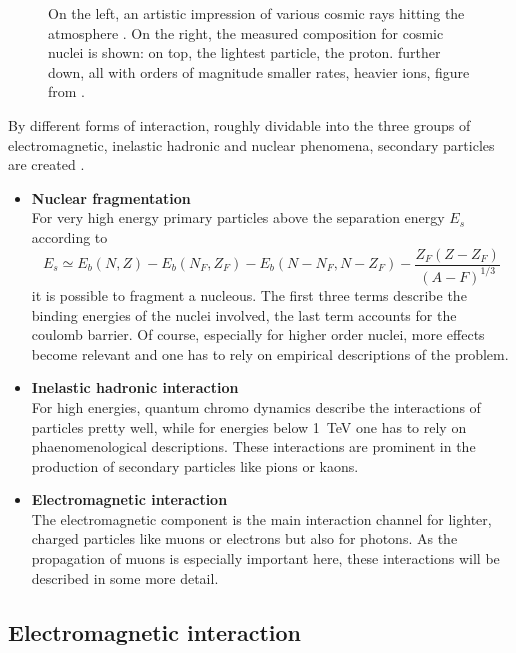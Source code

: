 \begin{figure}
\begin{minipage}[d]{0.49 \textwidth}
	\end{minipage}
	\caption[Cosmic ray composition]{On the left, an artistic impression of various cosmic rays hitting the atmosphere \cite{airShower}. On the right, the measured composition for cosmic nuclei is shown: on top, the lightest particle, the proton. further down, all with orders of magnitude smaller rates, heavier ions, figure from \cite{highEnergyCosmicRays}.}
	\label{fig:Introduction:sec:CosmicRays}
    \end{figure}
    By different forms of interaction, roughly dividable into the three groups of electromagnetic, inelastic hadronic and nuclear phenomena, secondary particles are created \cite{highEnergyCosmicRays}. 
    \begin{itemize}
    	\item {\bf Nuclear fragmentation}\\
    	For very high energy primary particles above the separation energy $E_s$ according to 
		\begin{equation}
			E_s \simeq E_b(N,Z) - E_b(N_F, Z_F) - E_b(N - N_F, N - Z_F) - \frac{Z_F(Z -Z_F)}{(A-F)^{1/3}}
		\end{equation}
		it is possible to fragment a nucleous. The first three terms describe the binding energies of the nuclei involved, the last term accounts for the coulomb barrier. Of course, especially for higher order nuclei, more effects become relevant and one has to rely on empirical descriptions of the problem.
		\item{\bf Inelastic hadronic interaction}\\
		For high energies, quantum chromo dynamics describe the interactions of particles pretty well, while for energies below \SI{1}{\TeV} one has to rely on phaenomenological descriptions. These interactions are prominent in the production of secondary particles like pions or kaons.
		
		\item{\bf Electromagnetic interaction}\\
		The electromagnetic component is the main interaction channel for lighter, charged particles like muons or electrons but also for photons. As the propagation of muons is especially important here, these interactions will be described in some more detail.
	\end{itemize}
	\subsection{Electromagnetic interaction}
	
